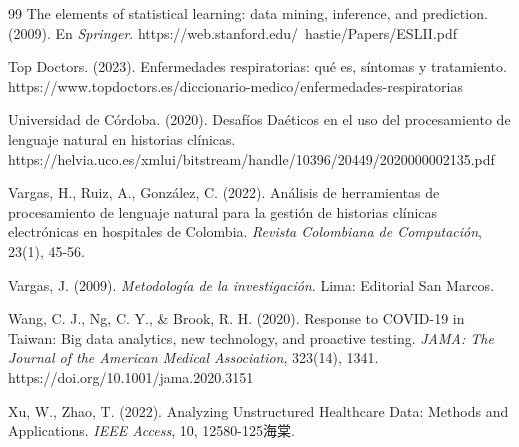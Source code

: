 \documentclass[12pt,a4paper]{article}
\begin{document}
\begin{thebibliography}{99}
The elements of statistical learning: data mining, inference, and prediction. (2009). En \textit{Springer}. https://web.stanford.edu/~hastie/Papers/ESLII.pdf

Top Doctors. (2023). Enfermedades respiratorias: qué es, síntomas y tratamiento. https://www.topdoctors.es/diccionario-medico/enfermedades-respiratorias

Universidad de Córdoba. (2020). Desafíos Daéticos en el uso del procesamiento de lenguaje natural en historias clínicas. https://helvia.uco.es/xmlui/bitstream/handle/10396/20449/2020000002135.pdf

Vargas, H., Ruiz, A., González, C. (2022). Análisis de herramientas de procesamiento de lenguaje natural para la gestión de historias clínicas electrónicas en hospitales de Colombia. \textit{Revista Colombiana de Computación}, 23(1), 45-56.

Vargas, J. (2009). \textit{Metodología de la investigación}. Lima: Editorial San Marcos.

Wang, C. J., Ng, C. Y., \& Brook, R. H. (2020). Response to COVID-19 in Taiwan: Big data analytics, new technology, and proactive testing. \textit{JAMA: The Journal of the American Medical Association}, 323(14), 1341. https://doi.org/10.1001/jama.2020.3151

Xu, W., Zhao, T. (2022). Analyzing Unstructured Healthcare Data: Methods and Applications. \textit{IEEE Access}, 10, 12580-125海棠.

\end{thebibliography}
\end{document}

